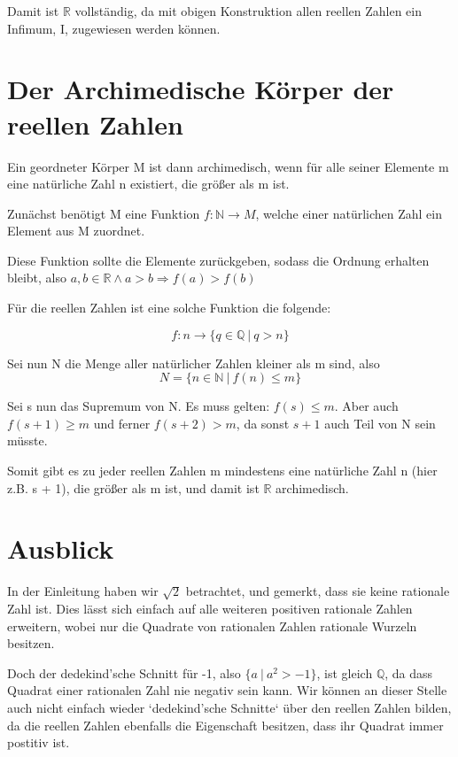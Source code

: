 \documentclass[12pt]{article}
\begin{document}
    Damit ist $\mathbb{R}$ vollständig, da mit obigen Konstruktion allen reellen Zahlen ein Infimum, I, zugewiesen werden
    können.

    \section{Der Archimedische Körper der reellen Zahlen}

    Ein geordneter Körper M ist dann archimedisch, wenn für alle seiner Elemente m eine natürliche Zahl n existiert,
    die größer als m ist.

    Zunächst benötigt M eine Funktion $f: \mathbb{N} \rightarrow M$,
    welche einer natürlichen Zahl ein Element aus M zuordnet.

    Diese Funktion sollte die Elemente zurückgeben, sodass die Ordnung erhalten bleibt, also
    $a, b \in \mathbb{R} \land a > b \Rightarrow f(a) > f(b)$

    Für die reellen Zahlen ist eine solche Funktion die folgende:

    \[f: n \rightarrow \{q \in \mathbb{Q} \mspace{4mu} | \mspace{4mu} q > n\}\]

    Sei nun N die Menge aller natürlicher Zahlen kleiner als m sind, also
    \[N = \{n \in \mathbb{N} \mspace{4mu} | \mspace{4mu} f(n) \le m\}\]

    Sei s nun das Supremum von N.
    Es muss gelten: $f(s) \le m$.
    Aber auch $f(s+1) \ge m$ und ferner $f(s+2) > m$, da sonst $s+1$ auch Teil von N sein müsste.

    Somit gibt es zu jeder reellen Zahlen m mindestens eine natürliche Zahl n (hier z.B. s + 1), die größer als m ist,
    und  damit ist $\mathbb{R}$ archimedisch.

    \newpage

    \section{Ausblick}

    In der Einleitung haben wir $\sqrt{2}$ betrachtet, und gemerkt, dass sie keine rationale Zahl ist.
    Dies lässt sich einfach auf alle weiteren positiven rationale Zahlen erweitern, wobei nur die Quadrate von rationalen Zahlen
    rationale Wurzeln besitzen.

    Doch der dedekind'sche Schnitt für -1, also $\{a \mspace{4mu} | \mspace{4mu} a^2 > -1\}$, ist gleich $\mathbb{Q}$,
    da dass Quadrat einer rationalen Zahl nie negativ sein kann.
    Wir können an dieser Stelle auch nicht einfach wieder `dedekind'sche Schnitte` über den reellen Zahlen bilden,
    da die reellen Zahlen ebenfalls die Eigenschaft besitzen, dass ihr Quadrat immer postitiv ist.
\end{document}

